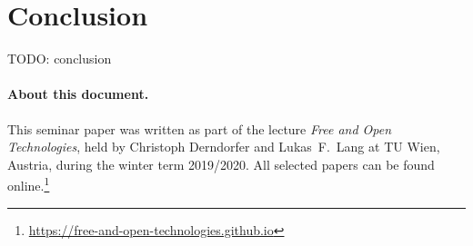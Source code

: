 \documentclass[a4paper, 11pt]{article}
\begin{document}
\section{Conclusion}\label{sec:conclusion}
TODO: conclusion







\paragraph{About this document.} This seminar paper was written as part of the lecture \emph{Free and Open Technologies}, held by Christoph Derndorfer and Lukas~F.\ Lang at TU Wien, Austria, during the winter term 2019/2020.
All selected papers can be found online.\footnote{\url{https://free-and-open-technologies.github.io}}

\doclicenseThis
\end{document}
